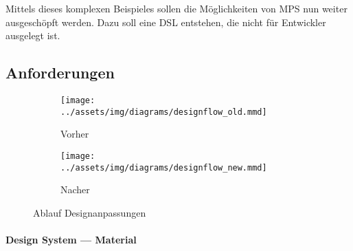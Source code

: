 Mittels dieses komplexen Beispieles sollen die Möglichkeiten von \ac{MPS} nun weiter ausgeschöpft werden.
Dazu soll eine \ac{DSL} entstehen, die nicht für Entwickler ausgelegt ist.

\subsection{Anforderungen}\label{subsec:anforderungen}
\begin{figure}[ht]
    \begin{subfigure}[c]{0.5\textwidth}
        \begin{center}
            \texttt{[image: ../assets/img/diagrams/designflow\_old.mmd]}
        \end{center}
        \caption{Vorher}
        \label{fig:ablauf-designanpassungen-alt}
    \end{subfigure}
    \begin{subfigure}[c]{0.5\textwidth}
        \begin{center}
            \texttt{[image: ../assets/img/diagrams/designflow\_new.mmd]}
        \end{center}
        \caption{Nacher}
        \label{fig:ablauf-designanpassungen-neu}
    \end{subfigure}
    \caption{Ablauf Designanpassungen}
    \label{fig:ablauf-designanpassungen}
\end{figure}
\lipsum[5]

\paragraph{Design System --- Material}
\lipsum[5]

\lipsum[5]

